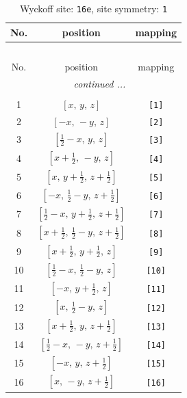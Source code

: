 \documentclass[fleqn,8pt]{jsarticle}
\begin{document}
\begin{longtable}{ccc}
\caption{Wyckoff site: {\tt 16e}, site symmetry: {\tt 1}}
 \\
 \hline \hline
No. & position & mapping \\ \hline \endfirsthead

\multicolumn{2}{l}{\tablename\ \thetable{}} \\
 \hline \hline
No. & position & mapping \\ \hline \endhead

 \hline \hline
\multicolumn{2}{r}{\footnotesize\it continued ...} \\ \endfoot

 \hline \hline
\multicolumn{2}{r}{} \\ \endlastfoot

1 & $\left[ x,\, y,\, z \right]$ & {\tt [1]} \\ \hline
2 & $\left[ - x,\, - y,\, z \right]$ & {\tt [2]} \\ \hline
3 & $\left[ \frac{1}{2} - x,\, y,\, z \right]$ & {\tt [3]} \\ \hline
4 & $\left[ x + \frac{1}{2},\, - y,\, z \right]$ & {\tt [4]} \\ \hline
5 & $\left[ x,\, y + \frac{1}{2},\, z + \frac{1}{2} \right]$ & {\tt [5]} \\ \hline
6 & $\left[ - x,\, \frac{1}{2} - y,\, z + \frac{1}{2} \right]$ & {\tt [6]} \\ \hline
7 & $\left[ \frac{1}{2} - x,\, y + \frac{1}{2},\, z + \frac{1}{2} \right]$ & {\tt [7]} \\ \hline
8 & $\left[ x + \frac{1}{2},\, \frac{1}{2} - y,\, z + \frac{1}{2} \right]$ & {\tt [8]} \\ \hline
9 & $\left[ x + \frac{1}{2},\, y + \frac{1}{2},\, z \right]$ & {\tt [9]} \\ \hline
10 & $\left[ \frac{1}{2} - x,\, \frac{1}{2} - y,\, z \right]$ & {\tt [10]} \\ \hline
11 & $\left[ - x,\, y + \frac{1}{2},\, z \right]$ & {\tt [11]} \\ \hline
12 & $\left[ x,\, \frac{1}{2} - y,\, z \right]$ & {\tt [12]} \\ \hline
13 & $\left[ x + \frac{1}{2},\, y,\, z + \frac{1}{2} \right]$ & {\tt [13]} \\ \hline
14 & $\left[ \frac{1}{2} - x,\, - y,\, z + \frac{1}{2} \right]$ & {\tt [14]} \\ \hline
15 & $\left[ - x,\, y,\, z + \frac{1}{2} \right]$ & {\tt [15]} \\ \hline
16 & $\left[ x,\, - y,\, z + \frac{1}{2} \right]$ & {\tt [16]} \\
\end{longtable}
\end{document}
